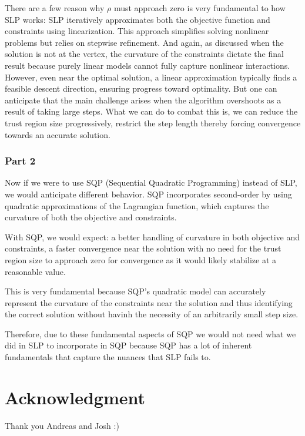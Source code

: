 \documentclass{article}
\begin{document}
There are a few reason why $\rho$ must approach zero is very fundamental to how SLP works: SLP iteratively approximates both the objective function and constraints using linearization. This approach simplifies solving nonlinear problems but relies on stepwise refinement. And again, as discussed when the solution is not at the vertex, the curvature of the constraints dictate the final result because purely linear models cannot fully capture nonlinear interactions. However, even near the optimal solution, a linear approximation typically finds a feasible descent direction, ensuring progress toward optimality. But one can anticipate that the main challenge arises when the algorithm overshoots as a result of taking large steps. What we can do to combat this is, we can reduce the trust region size progressively, restrict the step length thereby forcing convergence towards an accurate solution.



\subsubsection{Part 2}
Now if we were to use SQP (Sequential Quadratic Programming) instead of SLP, we would anticipate different behavior. SQP incorporates second-order by using quadratic approximations of the Lagrangian function, which captures the curvature of both the objective and constraints.

With SQP, we would expect: a better handling of curvature in both objective and constraints, a faster convergence near the solution with no need for the trust region size to approach zero for convergence as it would likely stabilize at a reasonable value.

This is very fundamental because SQP's quadratic model can accurately represent the curvature of the constraints near the solution and thus identifying the correct solution without havinh the necessity of an arbitrarily small step size.

Therefore, due to these fundamental aspects of SQP we would not need what we did in SLP to incorporate in SQP because SQP has a lot of inherent fundamentals that capture the nuances that SLP fails to. 

\section{Acknowledgment}
Thank you Andreas and Josh :)
\end{document}
